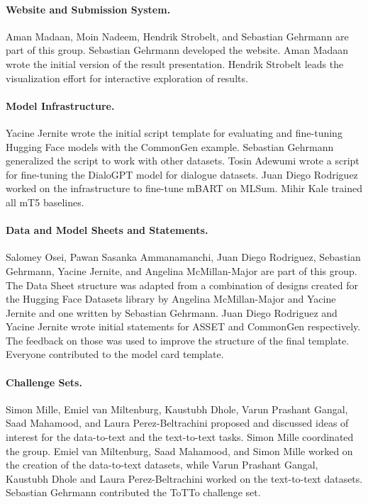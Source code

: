 \documentclass[11pt,a4paper]{article}
\begin{document}
\paragraph{Website and Submission System.} Aman Madaan, Moin Nadeem, Hendrik Strobelt, and Sebastian Gehrmann are part of this group. Sebastian Gehrmann developed the website. Aman Madaan wrote the initial version of the result presentation. Hendrik Strobelt leads the visualization effort for interactive exploration of results.



\paragraph{Model Infrastructure.} Yacine Jernite wrote the initial script template for evaluating and fine-tuning Hugging Face models with the CommonGen example. Sebastian Gehrmann generalized the script to work with other datasets.
Tosin Adewumi wrote a script for fine-tuning the DialoGPT model for dialogue datasets. Juan Diego Rodriguez worked on the infrastructure to fine-tune mBART on MLSum. Mihir Kale trained all mT5 baselines. 


\paragraph{Data and Model Sheets and Statements.} Salomey Osei, Pawan Sasanka Ammanamanchi, Juan Diego Rodriguez, Sebastian Gehrmann, Yacine Jernite, and Angelina McMillan-Major are part of this group. The Data Sheet structure was adapted from a combination of designs created for the Hugging Face Datasets library by Angelina McMillan-Major and Yacine Jernite and one written by Sebastian Gehrmann. Juan Diego Rodriguez and Yacine Jernite wrote initial statements for ASSET and CommonGen respectively. The feedback on those was used to improve the structure of the final template. Everyone contributed to the model card template. 


\paragraph{Challenge Sets.} Simon Mille, Emiel van Miltenburg, Kaustubh Dhole, Varun Prashant Gangal, Saad Mahamood, and Laura Perez-Beltrachini proposed and discussed ideas of interest for the data-to-text and the text-to-text tasks. Simon Mille coordinated the group. Emiel van Miltenburg, Saad Mahamood, and Simon Mille worked on the creation of the data-to-text datasets, while Varun Prashant Gangal, Kaustubh Dhole and Laura Perez-Beltrachini worked on the text-to-text datasets. Sebastian Gehrmann contributed the ToTTo challenge set. 
\end{document}
